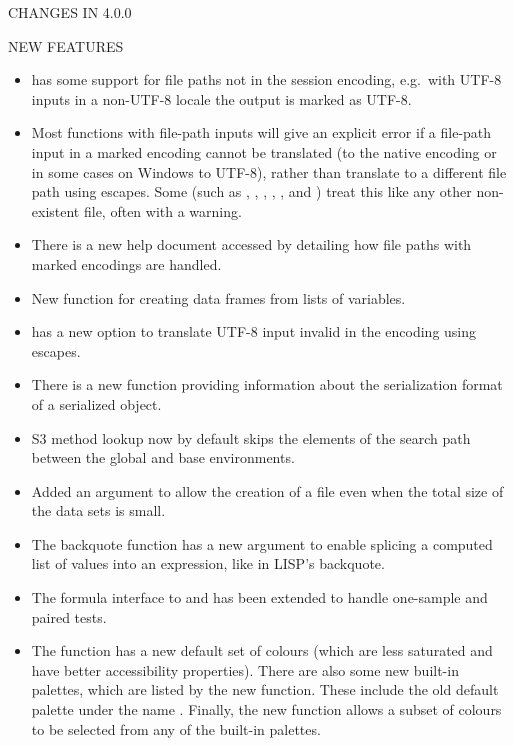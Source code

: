 \documentclass[letterpaper]{book}
\begin{document}
\begin{Section}{ CHANGES IN 4.0.0}
\begin{SubSection}{NEW FEATURES}
\begin{itemize}
\item{}  has some support for file paths not in
the session encoding, e.g.~with UTF-8 inputs in a
non-UTF-8 locale the output is marked as UTF-8.

\item{} Most functions with file-path inputs will give an explicit
error if a file-path input in a marked encoding cannot be
translated (to the native encoding or in some cases on Windows to
UTF-8), rather than translate to a different file path using
escapes.  Some (such as , ,
, , ,
 and ) treat this like
any other non-existent file, often with a warning.

\item{} There is a new help document accessed by
 detailing how file paths with
marked encodings are handled.

\item{} New function  for creating data frames from
lists of variables.

\item{}  has a new option  to
translate UTF-8 input invalid in the  encoding using
 escapes.

\item{} There is a new function  providing information
about the serialization format of a serialized object.

\item{} S3 method lookup now by default skips the elements of the
search path between the global and base environments.

\item{} Added an argument  to
allow the creation of a  file even when the
total size of the data sets is small.

\item{} The backquote function  has a new argument
 to enable splicing a computed list of values into an
expression, like  in LISP's backquote.

\item{} The formula interface to  and
 has been extended to handle one-sample and
paired tests.

\item{} The  function has a new default set of
colours (which are less saturated and have better accessibility
properties).  There are also some new built-in palettes, which
are listed by the new  function.  These
include the old default palette under the name . Finally,
the new  function allows a subset of
colours to be selected from any of the built-in palettes.


\end{itemize}
\end{SubSection}
\end{Section}
\end{document}
